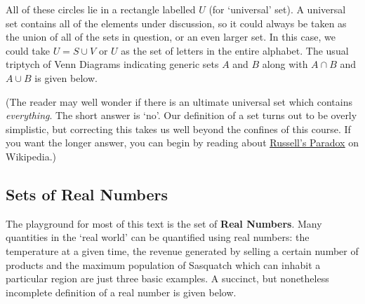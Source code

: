 \medskip

All of these circles lie in a rectangle labelled $U$ (for `universal' set).  A universal set contains all of the elements under discussion, so it could always be taken as the union of all of the sets in question, or an even larger set.  In this case, we could take $U = S \cup V$ or $U$ as the set of letters in the entire alphabet.    The usual triptych of Venn Diagrams indicating generic sets $A$ and  $B$ along with $A \cap B$ and $A \cup B$ is given below.

(The reader may well wonder if there is an ultimate universal set which contains \textit{everything}.  The short answer is `no'. Our definition of a set turns out to be overly simplistic, but correcting this takes us well beyond the confines of this course. If you want the longer answer, you can begin by reading about \href{http://en.wikipedia.org/wiki/Russell's_paradox}{\underline{Russell's Paradox}} on Wikipedia.)


\subsection{Sets of Real Numbers}
\label{SetsofNumbers}

The playground for most of this text is the set of \textbf{Real Numbers}.  Many quantities in the `real world' can be quantified using real numbers: the temperature at a given time, the revenue generated by selling a certain number of products and the maximum population of Sasquatch which can inhabit a particular region are just three basic examples.   A succinct, but nonetheless incomplete definition of a real number is given below.

\medskip

